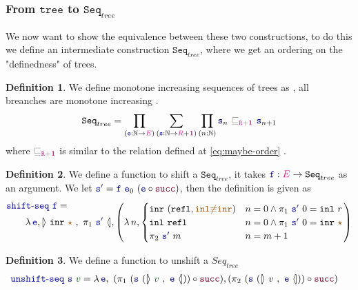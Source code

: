 \documentclass[twoside,11pt,openright]{report}
\theoremstyle{plain} %
\theoremstyle{definition}
\newtheorem{defn}{Definition}[section]
\theoremstyle{remark}
\newcommand*{\term}[1]{\textcolor{green!30!black}{#1}} %
\newcommand*{\type}[1]{\textcolor{magenta!90!black}{#1}}
\newcommand*{\unit}{\type{\textbf{1}}}
\newcommand*{\relation}[1]{\textcolor{gray}{\ensuremath{\mathtt{#1}}}}
\newcommand*{\constant}[1]{\textcolor{orange!60!black}{\ensuremath{\mathtt{#1}}}}
\newcommand*{\function}[1]{\textcolor{blue!60!black}{\ensuremath{\mathtt{#1}}}}
\newcommand*{\constructor}[1]{\textcolor{purple!60!black}{\ensuremath{\mathtt{#1}}}}
\newcommand*{\typeformer}[1]{\ensuremath{\mathtt{#1}}}
\newcommand*{\unitelem}{\constant{\star}} %
\newcommand*{\natcases}[2]{\ensuremath{\mathbb{[\hspace{-.5mm}\rangle}~\ensuremath{#1}~,~\ensuremath{#2}~\mathbb{\langle\hspace{-.5mm}]}}}
\begin{document}
\subsubsection{From \(\typeformer{tree}\) to \(\typeformer{Seq}_{tree}\)}
We now want to show the equivalence between these two constructions, to do this we define an intermediate construction \(\typeformer{Seq}_{tree}\), where we get an ordering on the "definedness" of trees.
\begin{defn}
  We define monotone increasing sequences of trees as , all breanches are monotone increasing .
  \begin{equation}
    \typeformer{Seq}_{tree} = \prod_{(\function{e} : \mathbb{N} \rightarrow \type{E})} \sum_{(\function{s} : \mathbb{N} \rightarrow \type{R} + \unit)} \prod_{(n : \mathbb{N})} \function{s}_n~\relation{\sqsubseteq_{\type{R}+\unit}}~\function{s}_{n+1}
  \end{equation}
  where \(\relation{\sqsubseteq_{\type{R}+\unit}}\) is similar to the relation defined at \eqref{eq:maybe-order} .
\end{defn}
\begin{defn}
  We define a function to shift a \(\typeformer{Seq}_{tree}\), it takes \(\function{f} : \type{E} \rightarrow \typeformer{Seq}_{tree}\) as an argument. We let \(\function{s'} = \function{f}~\function{e}_0~(\function{e} \circ \constructor{succ})\), then the definition is given as
  \begin{equation}
    \begin{aligned}
      &\function{shift\text{-}seq}~\function{f} = \\[-5mm]
      &\qquad \lambda\,\function{e}, \natcases{\mathtt{inr}~\unitelem}{\pi_1~\function{s'}} , \left(\lambda\,n, \begin{cases} \mathtt{inr}~(\mathtt{refl} , \constant{inl{\not\equiv}inr}) & n = 0 \land \pi_1~\function{s'}~0 = \mathtt{inl}~r \\ \mathtt{inl}~\mathtt{refl} & n = 0 \land \pi_1~\function{s'}~0 = \mathtt{inr}~\unitelem \\ \pi_2~\function{s'}~m & n = m + 1 \end{cases}\right)
    \end{aligned}
  \end{equation}
\end{defn}
\begin{defn}
  We define a function to unshift a \(Seq_{tree}\)
  \begin{equation}
    \begin{aligned}
      &\function{unshift\text{-}seq}~\function{s}~\term{v} = \lambda\,\function{e},~(\pi_1~(\function{s}~(\natcases{\term{v}}{\function{e}})) \circ \constructor{succ}) , (\pi_2~(\function{s}~(\natcases{v}{\function{e}})) \circ \constructor{succ})
    \end{aligned}
  \end{equation}
\end{defn}
\end{document}
